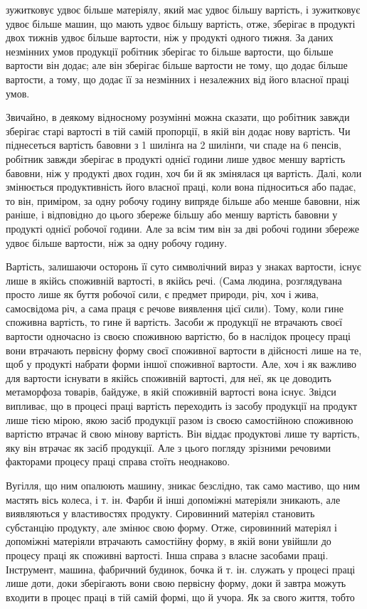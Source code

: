\parcont{}  %
зужитковує удвоє більше матеріялу, який має удвоє більшу
вартість, і зужитковує удвоє більше машин, що мають удвоє
більшу вартість, отже, зберігає в продукті двох тижнів удвоє
більше вартости, ніж у продукті одного тижня. За даних незмінних
умов продукції робітник зберігає то більше вартости, що
більше вартости він додає; але він зберігає більше вартости не
тому, що додає більше вартости, а тому, що додає її за незмінних
і незалежних від його власної праці умов.

Звичайно, в деякому відносному розумінні можна сказати,
що робітник завжди зберігає старі вартості в тій самій пропорції, в
якій він додає нову вартість. Чи піднесеться вартість бавовни з
1 шилінґа на 2 шилінґи, чи спаде на 6 пенсів, робітник завжди
зберігає в продукті однієї години лише удвоє меншу вартість
бавовни, ніж у продукті двох годин, хоч би й як змінялася ця
вартість. Далі, коли змінюється продуктивність його власної праці,
коли вона підноситься або падає, то він, приміром, за одну робочу
годину випряде більше або менше бавовни, ніж раніше, і відповідно
до цього збереже більшу або меншу вартість бавовни у
продукті однієї робочої години. Але за всім тим він за дві робочі
години збереже удвоє більше вартости, ніж за одну робочу годину.

Вартість, залишаючи осторонь її суто символічний вираз у
знаках вартости, існує лише в якійсь споживній вартості, в якійсь
речі. (Сама людина, розглядувана просто лише як буття робочої
сили, є предмет природи, річ, хоч і жива, самосвідома річ, а сама
праця є речове виявлення цієї сили). Тому, коли гине споживна
вартість, то гине й вартість. Засоби ж продукції не втрачають
своєї вартости одночасно із своєю споживною вартістю, бо в наслідок
процесу праці вони втрачають первісну форму своєї споживної
вартости в дійсності лише на те, щоб у продукті набрати форми
іншої споживної вартости. Але, хоч і як важливо для вартости
існувати в якійсь споживній вартості, для неї, як це доводить
метаморфоза товарів, байдуже, в якій споживній вартості вона
існує. Звідси випливає, що в процесі праці вартість переходить
із засобу продукції на продукт лише тією мірою, якою засіб продукції
разом із своєю самостійною споживною вартістю втрачає
й свою мінову вартість. Він віддає продуктові лише ту вартість,
яку він втрачає як засіб продукції. Але з цього погляду зрізними
речовими факторами процесу праці справа стоїть неоднаково.

Вугілля, що ним опалюють машину, зникає безслідно, так
само мастиво, що ним мастять вісь колеса, і т. ін. Фарби й інші
допоміжні матеріяли зникають, але виявляються у властивостях
продукту. Сировинний матеріял становить субстанцію продукту,
але змінює свою форму. Отже, сировинний матеріял і допоміжні
матеріяли втрачають самостійну форму, в якій вони увійшли до
процесу праці як споживні вартості. Інша справа з власне засобами
праці. Інструмент, машина, фабричний будинок, бочка й
т. ін. служать у процесі праці лише доти, доки зберігають вони
свою первісну форму, доки й завтра можуть входити в процес
праці в тій самій формі, що й учора. Як за свого життя, тобто
\parbreak{}  %
